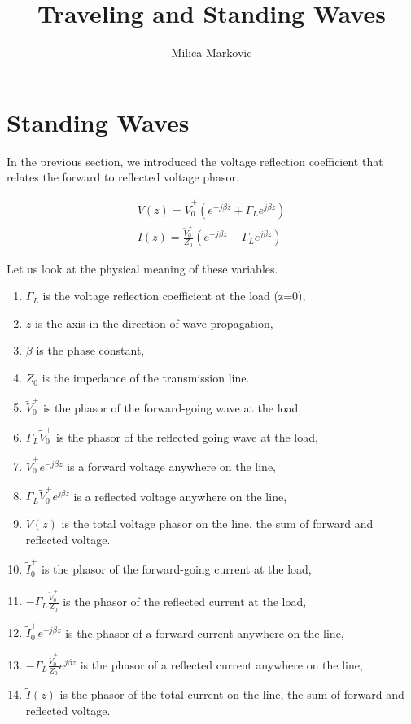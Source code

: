 \documentclass{ximera}
\title{Traveling and Standing Waves}
\author{Milica Markovic}
\begin{document}
  
\begin{abstract}  

\end{abstract}  
\maketitle    





\section{Standing Waves}


In the previous section, we introduced the voltage reflection coefficient that relates the forward to reflected voltage phasor.

\begin{eqnarray}
\tilde{V}(z)= \tilde{V}_0^+ (e^{-j \beta z} + \Gamma_L  e^{j \beta z }  ) \label{eq:vtlfin} \\
I(z)=   \frac{\tilde{V}_0^+}{Z_0}  (e^{-j \beta z} - \Gamma_L  e^{j \beta z}  ) \label{eq:itlfin}
\end{eqnarray}


 Let us look at the physical meaning of these variables.

\begin{enumerate}
\item $\Gamma_L$ is the voltage reflection coefficient at the load (z=0), 
\item $z$ is the axis in
the direction of wave propagation, 
\item $\beta$ is the phase
constant,
\item $Z_0$ is the impedance of the transmission line. 
\item $\tilde{V}_0^+$ is the phasor of the forward-going wave at the load,
\item $\Gamma _L \tilde{V}_0^+$ is the phasor of the reflected going wave at the load,
\item $\tilde{V}_0^+ e^{-j \beta z} $ is a forward voltage anywhere on the line, 
 \item $ \Gamma _L \tilde{V}_0^+ e^{j \beta z} $ is a reflected voltage anywhere on the line, 
\item $\tilde{V}(z)$ is the total voltage phasor on the line, the sum of forward and reflected voltage.
\item $\tilde{I}_0^+$ is the phasor of the forward-going current  at the load,
\item $-\Gamma _L \frac{\tilde{V}_0^+}{Z_0}$ is the phasor of the reflected current at the load,
\item $\tilde{I}_0^+ e^{-j \beta z} $ is the phasor of a forward current  anywhere on the line, 
 \item $-\Gamma _L \frac{\tilde{V}_0^+}{Z_0} e^{j \beta z} $ is the phasor of a reflected current anywhere on the line, 
\item $\tilde{I}(z)$ is the phasor of the total current on the line, the sum of forward and reflected voltage.
\end{enumerate}
 
\end{document}
